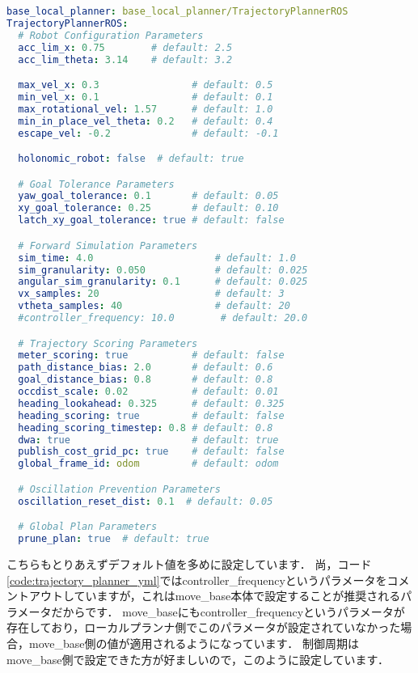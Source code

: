 \documentclass[{../../master}]{subfiles}
\begin{document}
\begin{lstlisting}[language=YAML, label=code:trajectory_planner_yml, caption=\textsf{trajectory\_planner.yml}]
base_local_planner: base_local_planner/TrajectoryPlannerROS
TrajectoryPlannerROS:
  # Robot Configuration Parameters
  acc_lim_x: 0.75        # default: 2.5
  acc_lim_theta: 3.14    # default: 3.2

  max_vel_x: 0.3                # default: 0.5
  min_vel_x: 0.1                # default: 0.1
  max_rotational_vel: 1.57      # default: 1.0
  min_in_place_vel_theta: 0.2   # default: 0.4
  escape_vel: -0.2              # default: -0.1

  holonomic_robot: false  # default: true

  # Goal Tolerance Parameters
  yaw_goal_tolerance: 0.1       # default: 0.05
  xy_goal_tolerance: 0.25       # default: 0.10
  latch_xy_goal_tolerance: true # default: false

  # Forward Simulation Parameters
  sim_time: 4.0                     # default: 1.0
  sim_granularity: 0.050            # default: 0.025
  angular_sim_granularity: 0.1      # default: 0.025
  vx_samples: 20                    # default: 3
  vtheta_samples: 40                # default: 20
  #controller_frequency: 10.0        # default: 20.0

  # Trajectory Scoring Parameters
  meter_scoring: true           # default: false
  path_distance_bias: 2.0       # default: 0.6
  goal_distance_bias: 0.8       # default: 0.8
  occdist_scale: 0.02           # default: 0.01
  heading_lookahead: 0.325      # default: 0.325
  heading_scoring: true         # default: false
  heading_scoring_timestep: 0.8 # default: 0.8
  dwa: true                     # default: true
  publish_cost_grid_pc: true    # default: false
  global_frame_id: odom         # default: odom

  # Oscillation Prevention Parameters
  oscillation_reset_dist: 0.1  # default: 0.05

  # Global Plan Parameters
  prune_plan: true  # default: true
\end{lstlisting}

こちらもとりあえずデフォルト値を多めに設定しています．
尚，コード\ref{code:trajectory_planner_yml}では\textsf{controller\_frequency}というパラメータをコメントアウトしていますが，これは\textsf{move\_base}本体で設定することが推奨されるパラメータだからです．
\textsf{move\_base}にも\textsf{controller\_frequency}というパラメータが存在しており，ローカルプランナ側でこのパラメータが設定されていなかった場合，\textsf{move\_base}側の値が適用されるようになっています．
制御周期は\textsf{move\_base}側で設定できた方が好ましいので，このように設定しています．
\end{document}
